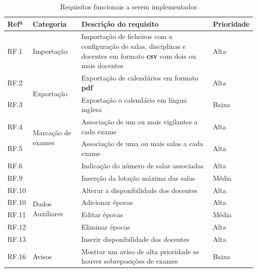 \documentclass[12pt, twoside]{report}
\begin{document}
	
\def\arraystretch{1.5}
	\begin{center}
		\label{requisitiosfuncionais}
		\begin{longtable}{|m{1cm}|m{2.2cm}|m{10cm}|m{2cm}|}
			\caption{Requisitos funcionais a serem implementados}\\
			
			\hline			
			\textbf{Refª }	& \textbf{Categoria}&\textbf{Descrição do requisito} & \textbf{Prioridade} \\
			\hline
			
			
			RF.1 &Importação& Importação de ficheiros com a configuração de salas, disciplinas e docentes em formato \textbf{csv} com dois ou mais docentes& Alta \\
			\hline
			
			RF.2 &\multirow{2}{2cm}{Exportação}& Exportação de calendários em formato \textbf{pdf} & Alta \\
			
			RF.3 && Exportação o calendário em língua inglesa & Baixa \\
			\hline
			
			RF.4 &\multirow{2}{2cm}{Marcação de exames}& Associação de um ou mais vigilantes a cada exame & Alta\\
						
			RF.5 &&	Associação de uma ou mais salas a cada exame & Alta\\
			
			RF.6 &&Indicação do número de salas associadas & Alta\\
			\hline
		
			RF.9 &\multirow{6}{2cm}{Dados Auxiliares}& Inserção da lotação máxima das salas& Média \\
			
			RF.10 && Alterar a disponibilidade dos docentes & Alta\\
			
			RF.10 && Adicionar épocas & Alta\\
			
			RF.11 && Editar épocas & Média\\
			
			RF.12 && Eliminar épocas & Alta\\
			
			RF.13 && Inserir disponibilidade dos docentes & Alta\\
			\hline
			
			RF.16 &\multirow{9}{2cm}{Avisos}& Mostrar um aviso de alta prioridade se houver sobreposições de exames & Baixa\\
						

\end{longtable}
\end{center}
\end{document}
